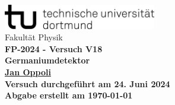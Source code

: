 \begin{titlepage}
    \centering
    \vspace*{1cm}
    \includegraphics[width=0.5\textwidth]{Ressourcen/tud_logo_schwarz(RGB)}\\
    \vspace*{0.25cm}
    \large\textmd{Fakultät Physik} \\
    \vspace*{6cm}
    \huge \bfseries FP-2024 - Versuch V18\\
    \vspace*{0.25cm}
    \large Germaniumdetektor\\
    \vspace*{0.25cm}
    \large\textmd{\href{mailto:jan.oppoli@tu-dortmund.de}{Jan Oppoli}} \\
    \vfill
    \small\textmd{Versuch durchgeführt am 24. Juni 2024}\\
    \small\textmd{Abgabe erstellt am \today}
  \end{titlepage}
  \tableofcontents 
  \newpage